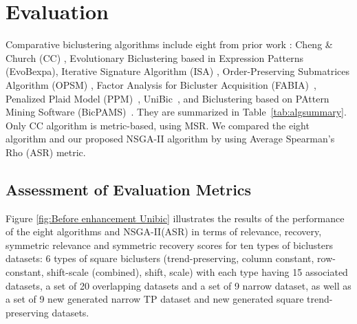 \section{Evaluation}
\label{sec:eval}




Comparative biclustering algorithms include eight from prior work \cite{icpram18}: Cheng \& Church (CC) \cite{cheng2000biclustering}, Evolutionary Biclustering based in Expression Patterns (EvoBexpa)\cite{pontes2013configurable}, Iterative Signature Algorithm (ISA) \cite{bergmann2003iterative}, Order-Preserving Submatrices Algorithm (OPSM) \cite{ben2003discovering}, Factor Analysis for Bicluster Acquisition (FABIA)~\cite{hochreiter2010fabia}, Penalized Plaid Model (PPM)~\cite{chekouo2015thepenalized}, UniBic~\cite{wang2016unibic}, and Biclustering based on PAttern Mining Software (BicPAMS)~\cite{henriques2017bicpams}. They are summarized in Table~\ref{tab:algsummary}. Only CC algorithm is metric-based, using MSR. We compared the eight algorithm and our proposed NSGA-II algorithm by using   Average  Spearman’s  Rho (ASR) metric.

\subsection{Assessment of Evaluation Metrics}

Figure \ref{fig:Before enhancement Unibic} illustrates the results of the performance of
the eight algorithms and NSGA-II(ASR) in terms of relevance, recovery, symmetric relevance and symmetric recovery scores for ten types of biclusters datasets: 6
types of square biclusters (trend-preserving, column constant, row-constant, shift-scale (combined), shift, scale) with each type having 15 associated datasets,
a set of 20 overlapping datasets and a set of 9 narrow dataset, as well as a set of 9 new generated narrow TP dataset and new generated square trend-preserving datasets.


